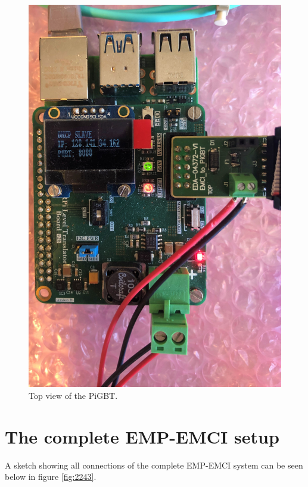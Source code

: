 \begin{figure}[H]
    \centering
    \includegraphics[width=.8\textwidth,angle=90]{Graphics/PiGBT.jpg}
    \caption{Top view of the PiGBT.}
    \label{fig:EMP_start}
\end{figure}
\newpage
\section{The complete EMP-EMCI setup}
A sketch showing all connections of the complete EMP-EMCI system can be seen below in figure \ref{fig:2243}.

